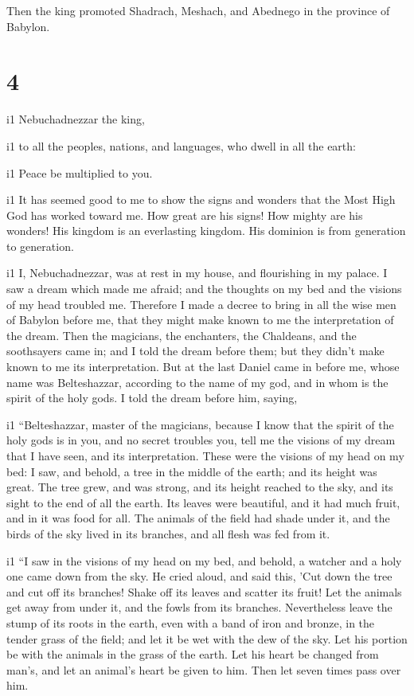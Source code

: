  Then the king promoted Shadrach, Meshach, and Abednego
in the province of Babylon.

\hypertarget{section-3}{%
\section{4}\label{section-3}}

i1  Nebuchadnezzar the king,

i1 to all the peoples, nations, and languages, who dwell in all the
earth:

i1 Peace be multiplied to you.

i1  It has seemed good to me to show the signs and wonders
that the Most High God has worked toward me.  How great
are his signs! How mighty are his wonders! His kingdom is an everlasting
kingdom. His dominion is from generation to generation.

i1  I, Nebuchadnezzar, was at rest in my house, and
flourishing in my palace.  I saw a dream which made me
afraid; and the thoughts on my bed and the visions of my head troubled
me.  Therefore I made a decree to bring in all the wise
men of Babylon before me, that they might make known to me the
interpretation of the dream.  Then the magicians, the
enchanters, the Chaldeans, and the soothsayers came in; and I told the
dream before them; but they didn't make known to me its interpretation.
 But at the last Daniel came in before me, whose name was
Belteshazzar, according to the name of my god, and in whom is the spirit
of the holy gods. I told the dream before him, saying,

i1  ``Belteshazzar, master of the magicians, because I
know that the spirit of the holy gods is in you, and no secret troubles
you, tell me the visions of my dream that I have seen, and its
interpretation.  These were the visions of my head on my
bed: I saw, and behold, a tree in the middle of the earth; and its
height was great.  The tree grew, and was strong, and its
height reached to the sky, and its sight to the end of all the earth.
 Its leaves were beautiful, and it had much fruit, and in
it was food for all. The animals of the field had shade under it, and
the birds of the sky lived in its branches, and all flesh was fed from
it.

i1  ``I saw in the visions of my head on my bed, and
behold, a watcher and a holy one came down from the sky. 
He cried aloud, and said this, 'Cut down the tree and cut off its
branches! Shake off its leaves and scatter its fruit! Let the animals
get away from under it, and the fowls from its branches. 
Nevertheless leave the stump of its roots in the earth, even with a band
of iron and bronze, in the tender grass of the field; and let it be wet
with the dew of the sky. Let his portion be with the animals in the
grass of the earth.  Let his heart be changed from man's,
and let an animal's heart be given to him. Then let seven times pass
over him.

